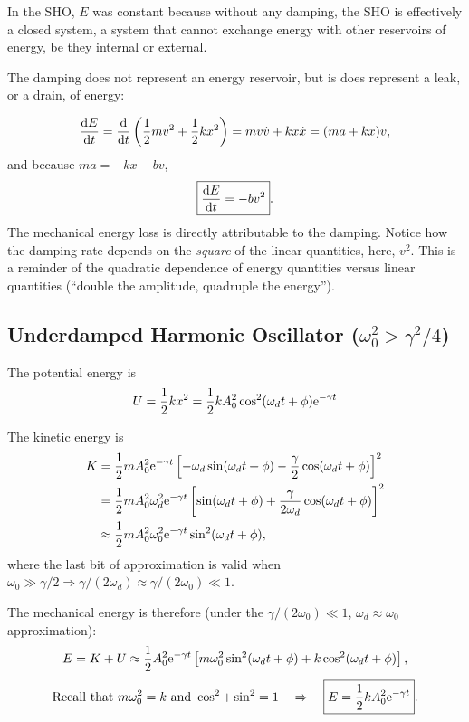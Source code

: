\documentclass[11pt]{article}
\begin{document}
In the SHO, \(E\) was constant because without any damping, the SHO is
effectively a closed system, a system that cannot exchange energy with
other reservoirs of energy, be they internal or external.

    The damping does not represent an energy reservoir, but is does
represent a leak, or a drain, of energy:

\[ \frac{\textrm{d} {E}}{\textrm{d} {t}} = \frac{\textrm{d} {}}{\textrm{d} {t}}\left(\frac12 m v^2 +\frac12k x^2\right) = mv\dot v + kx\dot x = (ma + kx)v, \]
and because \(ma = -kx - bv\), \[ \boxed{\frac{\textrm{d} {E}}{\textrm{d} {t}} =  -bv^2}. \] The
mechanical energy loss is directly attributable to the damping. Notice
how the damping rate depends on the \emph{square} of the linear
quantities, here, \(v^2\). This is a reminder of the quadratic
dependence of energy quantities versus linear quantities (``double the
amplitude, quadruple the energy'').

    \hypertarget{underdamped-harmonic-oscillator-omega_02-gamma24}{%
\subsection{\texorpdfstring{Underdamped Harmonic Oscillator
(\(\omega_0^2 > \gamma^2/4\))}{Underdamped Harmonic Oscillator (\textbackslash{}omega\_0\^{}2 \textgreater{} \textbackslash{}gamma\^{}2/4)}}\label{underdamped-harmonic-oscillator-omega_02-gamma24}}

The potential energy is
\[ U = \frac12 k x^2 =  \frac12 k A_0^2 \cos^2(\omega_d t + \phi) \textrm{e}^{-\gamma t}  \]

    The kinetic energy is \begin{align*}
    K & = \frac12 m A_0^2 \textrm{e}^{- \gamma t}\left[-\omega_d\sin(\omega_d t + \phi) - \frac{\gamma}{2}\cos(\omega_dt +\phi)\right]^2 \\
      & = \frac12 m A_0^2 \omega_d^2 \textrm{e}^{- \gamma t}\left[\sin(\omega_d t + \phi) + \frac{\gamma}{2\omega_d}\cos(\omega_dt +\phi)\right]^2 \\
      & \approx \frac12 m A_0^2 \omega_0^2 \textrm{e}^{- \gamma t}\sin^2(\omega_d t + \phi),
\end{align*} where the last bit of approximation is valid when
\(\omega_0 \gg \gamma/2 \Rightarrow \gamma/(2\omega_d) \approx \gamma/(2\omega_0) \ll 1\).

    The mechanical energy is therefore (under the
\(\gamma/(2\omega_0) \ll 1\), \(\omega_d \approx \omega_0\)
approximation):
\[ E = K + U \approx \frac12 A_0^2 \textrm{e}^{- \gamma t}\left[m\omega_0^2 \sin^2(\omega_d t + \phi) + k \cos^2(\omega_d t + \phi)\right], \]
\[\textrm{Recall that } m\omega_0^2 = k \textrm{ and } \cos^2 + \sin^2 = 1\quad \Rightarrow\quad \boxed{E = \frac12 k A_0^2 \textrm{e}^{- \gamma t}}.\]
\end{document}
